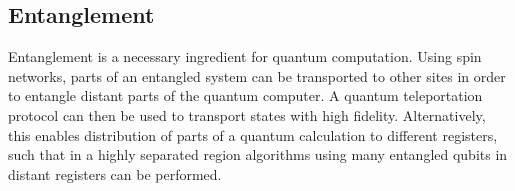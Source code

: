 \subsection{Entanglement}

\begin{center}
\end{center}

\noindent Entanglement is a necessary ingredient for quantum computation. Using spin networks, parts of an entangled system can be transported to other sites in order to entangle distant parts of the quantum computer\cite{Plastina2007}. A quantum teleportation protocol can then be used to transport states with high fidelity. Alternatively, this enables distribution of parts of a quantum calculation to different registers, such that in a highly separated region algorithms using many entangled qubits in distant registers can be performed.

